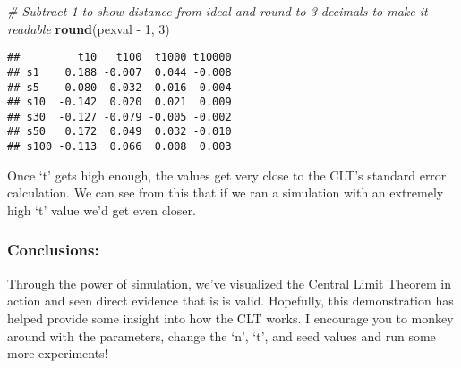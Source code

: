\documentclass[]{article}
\newenvironment{Shaded}{\begin{snugshade}}{\end{snugshade}}
\newcommand{\KeywordTok}[1]{\textcolor[rgb]{0.13,0.29,0.53}{\textbf{{#1}}}}
\newcommand{\DecValTok}[1]{\textcolor[rgb]{0.00,0.00,0.81}{{#1}}}
\newcommand{\StringTok}[1]{\textcolor[rgb]{0.31,0.60,0.02}{{#1}}}
\newcommand{\CommentTok}[1]{\textcolor[rgb]{0.56,0.35,0.01}{\textit{{#1}}}}
\newcommand{\NormalTok}[1]{{#1}}
\begin{document}
\begin{Shaded}
\begin{Highlighting}[]
\CommentTok{# Subtract 1 to show distance from ideal and round to 3 decimals to make it readable}
\KeywordTok{round}\NormalTok{(pexval -}\StringTok{ }\DecValTok{1}\NormalTok{, }\DecValTok{3}\NormalTok{)}
\end{Highlighting}
\end{Shaded}

\begin{verbatim}
##         t10   t100  t1000 t10000
## s1    0.188 -0.007  0.044 -0.008
## s5    0.080 -0.032 -0.016  0.004
## s10  -0.142  0.020  0.021  0.009
## s30  -0.127 -0.079 -0.005 -0.002
## s50   0.172  0.049  0.032 -0.010
## s100 -0.113  0.066  0.008  0.003
\end{verbatim}

Once `t' gets high enough, the values get very close to the CLT's
standard error calculation. We can see from this that if we ran a
simulation with an extremely high `t' value we'd get even closer.

\subsubsection{Conclusions:}\label{conclusions}

Through the power of simulation, we've visualized the Central Limit
Theorem in action and seen direct evidence that is is valid. Hopefully,
this demonstration has helped provide some insight into how the CLT
works. I encourage you to monkey around with the parameters, change the
`n', `t', and seed values and run some more experiments!
\end{document}
